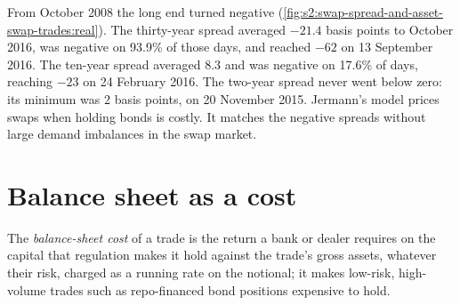 From October 2008 the long end turned negative (\cref{fig:s2:swap-spread-and-asset-swap-trades:real}). The thirty-year spread averaged $-21.4$ basis
points to October 2016, was negative on 93.9\% of those days, and reached $-62$ on 13 September 2016. The ten-year spread averaged 8.3 and was negative
on 17.6\% of days, reaching $-23$ on 24 February 2016. The two-year spread never went below zero: its minimum was 2 basis points, on 20 November 2015.
Jermann's model prices swaps when holding bonds is costly. It matches the negative spreads without large demand imbalances in the swap market.

\begin{omfigure}

\label{fig:s2:swap-spread-and-asset-swap-trades:real}
\end{omfigure}

\section{Balance sheet as a cost}

\begin{definition}\label{def:s2:swap-spread-and-asset-swap-trades:bscost}
The \emph{balance-sheet cost} of a trade is the return a bank or dealer requires on the capital that regulation makes it
hold against the trade's gross assets, whatever their risk, charged as a running rate on the notional; it makes low-risk, high-volume trades such as
repo-financed bond positions expensive to hold.
\end{definition}

